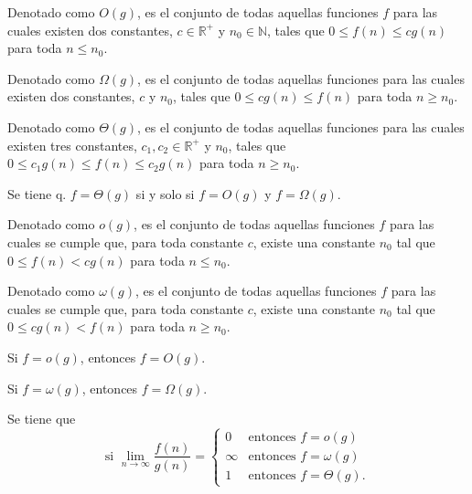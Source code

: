 \begin{defn}
  Denotado como \(O(g)\), es el conjunto de todas aquellas funciones \(f\) para las cuales existen dos constantes, \(c\in\mathbb{R}^+\) y \(n_0\in\mathbb{N}\), tales que \(0\leq f(n)\leq cg(n)\) para toda \(n\leq n_0\).
\end{defn}

\begin{defn}
  Denotado como \(\Omega(g)\), es el conjunto de todas aquellas funciones para las cuales existen dos constantes, \(c\) y \(n_0\), tales que \(0\leq cg(n)\leq f(n)\) para toda \(n\geq n_0\).
\end{defn}

\begin{defn}
  Denotado como \(\Theta(g)\), es el conjunto de todas aquellas funciones para las cuales existen tres constantes, \(c_1,c_2\in\mathbb{R}^+\) y \(n_0\), tales que \(0\leq c_1 g(n)\leq f(n)\leq c_2 g(n)\) para toda \(n\geq n_0\).
\end{defn}

\begin{prop}
  Se tiene q. \(f=\Theta(g)\) si y solo si \(f=O(g)\) y \(f=\Omega(g)\).
\end{prop}

\begin{defn}
  Denotado como \(o(g)\), es el conjunto de todas aquellas funciones \(f\) para las cuales se cumple que, para toda constante \(c\), existe una constante \(n_0\) tal que \(0\leq f(n)<cg(n)\) para toda \(n\leq n_0\).
\end{defn}

\begin{defn}
  Denotado como \(\omega(g)\), es el conjunto de todas aquellas funciones \(f\) para las cuales se cumple que, para toda constante \(c\), existe una constante \(n_0\) tal que \(0\leq cg(n)<f(n)\) para toda \(n\geq n_0\).
\end{defn}

\begin{prop}
  Si \(f=o(g)\), entonces \(f=O(g)\).
\end{prop}

\begin{prop}
  Si \(f=\omega(g)\), entonces \(f=\Omega(g)\).
\end{prop}

\begin{prop}
  Se tiene que
  \[
    \text{si }\lim_{n\to\infty}\dfrac{f(n)}{g(n)}=\begin{cases}
    0 & \text{entonces }f=o(g)\\
    \infty & \text{entonces }f=\omega(g)\\
    1 & \text{entonces }f=\Theta(g).
    \end{cases}
  \]
\end{prop}

